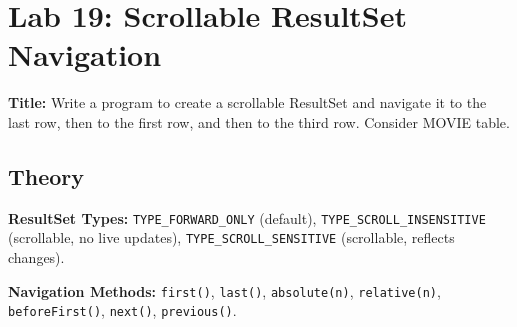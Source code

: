 \documentclass[10pt,a4paper]{article}
\begin{document}
\newpage
\section*{Lab 19: Scrollable ResultSet Navigation}

\textbf{Title:} Write a program to create a scrollable ResultSet and navigate it to the last row, then to the first row, and then to the third row. Consider MOVIE table.

\subsection*{Theory}
\textbf{ResultSet Types:} \texttt{TYPE\_FORWARD\_ONLY} (default), \texttt{TYPE\_SCROLL\_INSENSITIVE} (scrollable, no live updates), \texttt{TYPE\_SCROLL\_SENSITIVE} (scrollable, reflects changes).

\textbf{Navigation Methods:} \texttt{first()}, \texttt{last()}, \texttt{absolute(n)}, \texttt{relative(n)}, \texttt{beforeFirst()}, \texttt{next()}, \texttt{previous()}.
\end{document}
